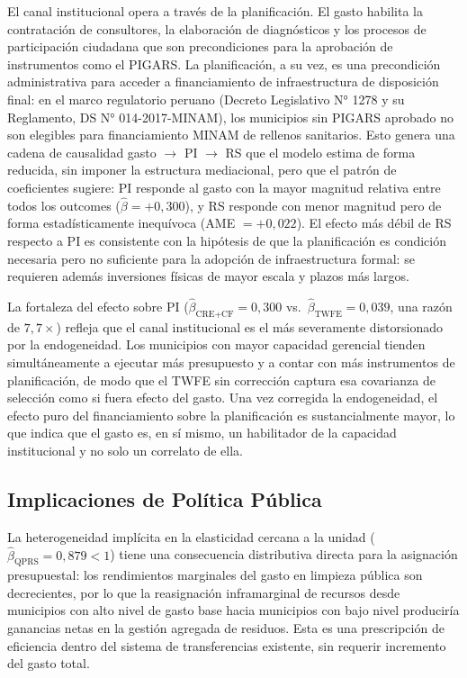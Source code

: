 El canal institucional opera a través de la planificación. El gasto habilita la contratación de consultores, la elaboración de diagnósticos y los procesos de participación ciudadana que son precondiciones para la aprobación de instrumentos como el PIGARS. La planificación, a su vez, es una precondición administrativa para acceder a financiamiento de infraestructura de disposición final: en el marco regulatorio peruano (Decreto Legislativo N° 1278 y su Reglamento, DS N° 014-2017-MINAM), los municipios sin PIGARS aprobado no son elegibles para financiamiento MINAM de rellenos sanitarios. Esto genera una cadena de causalidad gasto $\to$ PI $\to$ RS que el modelo estima de forma reducida, sin imponer la estructura mediacional, pero que el patrón de coeficientes sugiere: PI responde al gasto con la mayor magnitud relativa entre todos los outcomes ($\hat{\beta} = +0{,}300$), y RS responde con menor magnitud pero de forma estadísticamente inequívoca (AME $= +0{,}022$). El efecto más débil de RS respecto a PI es consistente con la hipótesis de que la planificación es condición necesaria pero no suficiente para la adopción de infraestructura formal: se requieren además inversiones físicas de mayor escala y plazos más largos.

La fortaleza del efecto sobre PI ($\hat{\beta}_{\text{CRE+CF}} = 0{,}300$ vs.\ $\hat{\beta}_{\text{TWFE}} = 0{,}039$, una razón de $7{,}7\times$) refleja que el canal institucional es el más severamente distorsionado por la endogeneidad. Los municipios con mayor capacidad gerencial tienden simultáneamente a ejecutar más presupuesto y a contar con más instrumentos de planificación, de modo que el TWFE sin corrección captura esa covarianza de selección como si fuera efecto del gasto. Una vez corregida la endogeneidad, el efecto puro del financiamiento sobre la planificación es sustancialmente mayor, lo que indica que el gasto es, en sí mismo, un habilitador de la capacidad institucional y no solo un correlato de ella.

\subsection{Implicaciones de Política Pública}
\label{sec:politica}

La heterogeneidad implícita en la elasticidad cercana a la unidad ($\hat{\beta}_{\text{QPRS}} = 0{,}879 < 1$) tiene una consecuencia distributiva directa para la asignación presupuestal: los rendimientos marginales del gasto en limpieza pública son decrecientes, por lo que la reasignación inframarginal de recursos desde municipios con alto nivel de gasto base hacia municipios con bajo nivel produciría ganancias netas en la gestión agregada de residuos. Esta es una prescripción de eficiencia dentro del sistema de transferencias existente, sin requerir incremento del gasto total.


